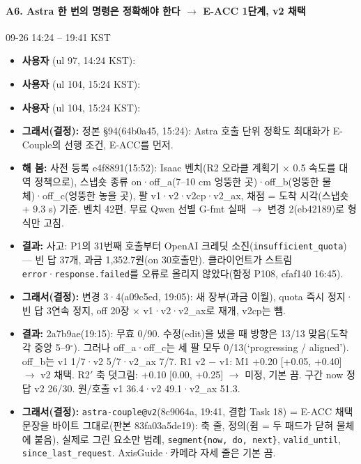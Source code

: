 \paragraph{A6. Astra 한 번의 명령은 정확해야 한다 $\rightarrow$ E-ACC 1단계, v2 채택}
{\small 09-26 14:24 -- 19:41 KST}
\begin{itemize}
  \item \textbf{사용자} (ul 97, 14:24 KST): 
  \item \textbf{사용자} (ul 104, 15:24 KST): 
  \item \textbf{사용자} (ul 104, 15:24 KST): 
  \item \textbf{그래서(결정):} 정본 §94(64b0a45, 15:24): Astra 호출 단위 정확도 최대화가 E-Couple의 선행 조건, E-ACC를 먼저.
  \item \textbf{해 봄:} 사전 등록 e4f8891(15:52): Isaac 벤치(R2 오라클 계획기 $\times$ 0.5 속도를 대역 정책으로), 스냅숏 종류 on·off\_a(7--10 cm 엉뚱한 곳)·off\_b(엉뚱한 물체)·off\_c(엉뚱한 놓을 곳), 팔 v1·v2·v2cp·v2\_ax, 채점 = 도착 시각(스냅숏 + 9.3 s) 기준. 벤치 42편. 무료 Qwen 선별 G-fmt 실패 $\rightarrow$ 변경 2(eb42189)로 형식만 고침.
  \item \textbf{결과:} 사고: P1의 31번째 호출부터 OpenAI 크레딧 소진(\texttt{insufficient\_\allowbreak{}quota}) --- 빈 답 37개, 과금 1,352.7원(on 30호출만). 클라이언트가 스트림 \texttt{error}·\texttt{response.\allowbreak{}failed}를 오류로 올리지 않았다(함정 P108, cfaf140 16:45).
  \item \textbf{그래서(결정):} 변경 3·4(a09c5ed, 19:05): 새 장부(과금 이월), quota 즉시 정지·빈 답 3연속 정지, off 20장 $\times$ v1·v2·v2\_ax로 재개, v2cp는 뺌.
  \item \textbf{결과:} 2a7b9ae(19:15): 무효 0/90. 수정(edit)을 냈을 때 방향은 13/13 맞음(도착 각 중앙 5--9$^\circ$). 그러나 off\_a·off\_c는 세 팔 모두 0/13(`progressing / aligned'). off\_b는 v1 1/7·v2 5/7·v2\_ax 7/7. R1 v2 $-$ v1: M1 +0.20 [+0.05, +0.40] $\rightarrow$ v2 채택. R2$'$ 축 덧그림: +0.10 [0.00, +0.25] $\rightarrow$ 미정, 기본 끔. 구간 now 정답 v2 26/30. 원/호출 v1 36.4·v2 49.1·v2\_ax 51.3.
  \item \textbf{그래서(결정):} \texttt{astra-\allowbreak{}couple@v2}(8c9064a, 19:41, 결합 Task 18) = E-ACC 채택 문장을 바이트 그대로(판본 83fa03a5de19): 축 줄, 정의(쥠 = 두 패드가 닫혀 물체에 붙음), 실제로 그린 요소만 범례, \texttt{segment\{now, do, next\}}, \texttt{valid\_\allowbreak{}until}, \texttt{since\_\allowbreak{}last\_\allowbreak{}request}. AxisGuide·카메라 자세 줄은 기본 끔.
\end{itemize}

